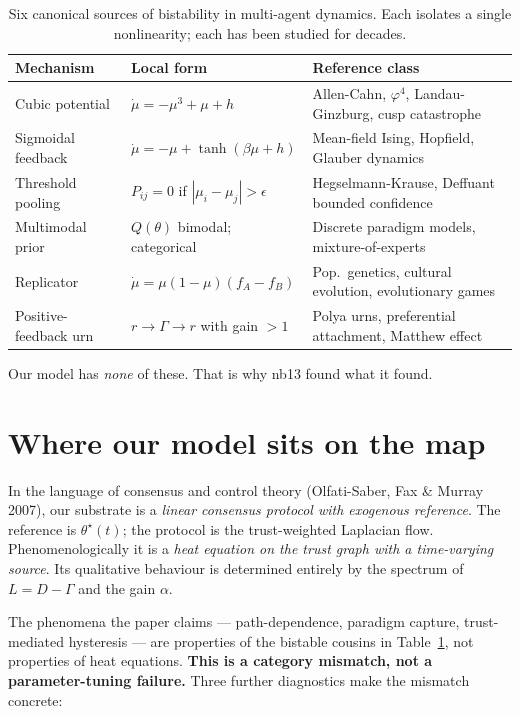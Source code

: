 \documentclass[11pt,a4paper]{article}
\theoremstyle{plain}
\begin{document}
\begin{table}[h]
\centering
\small
\begin{tabular}{p{3.6cm} p{4.8cm} p{5.4cm}}
\toprule
\textbf{Mechanism} & \textbf{Local form} & \textbf{Reference class} \\
\midrule
Cubic potential & $\dot{\mu} = -\mu^3 + \mu + h$
  & Allen-Cahn, $\varphi^4$, Landau-Ginzburg, cusp catastrophe \\
Sigmoidal feedback & $\dot{\mu} = -\mu + \tanh(\beta\mu + h)$
  & Mean-field Ising, Hopfield, Glauber dynamics \\
Threshold pooling & $P_{ij}=0$ if $|\mu_i-\mu_j|>\epsilon$
  & Hegselmann-Krause, Deffuant bounded confidence \\
Multimodal prior & $Q(\theta)$ bimodal; categorical
  & Discrete paradigm models, mixture-of-experts \\
Replicator & $\dot{\mu} = \mu(1-\mu)(f_A - f_B)$
  & Pop.\ genetics, cultural evolution, evolutionary games \\
Positive-feedback urn & $r \to \Gamma \to r$ with gain $>1$
  & Polya urns, preferential attachment, Matthew effect \\
\bottomrule
\end{tabular}
\caption{Six canonical sources of bistability in multi-agent dynamics. Each isolates a single nonlinearity; each has been studied for decades.}
\label{tab:mechanisms}
\end{table}

Our model has \emph{none} of these. That is why nb13 found what it
found.

\section{Where our model sits on the map}
\label{sec:map}

In the language of consensus and control theory (Olfati-Saber, Fax \&
Murray 2007), our substrate is a \emph{linear consensus protocol with
exogenous reference}. The reference is $\theta^\star(t)$; the protocol
is the trust-weighted Laplacian flow. Phenomenologically it is a
\emph{heat equation on the trust graph with a time-varying source}. Its
qualitative behaviour is determined entirely by the spectrum of
$L = D - \Gamma$ and the gain $\alpha$.

The phenomena the paper claims --- path-dependence, paradigm capture,
trust-mediated hysteresis --- are properties of the bistable cousins in
Table~\ref{tab:mechanisms}, not properties of heat equations. \textbf{This
is a category mismatch, not a parameter-tuning failure.} Three further
diagnostics make the mismatch concrete:
\end{document}
